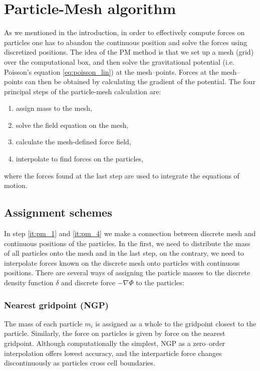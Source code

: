 \section{Particle-Mesh algorithm}
\label{sec:PM}
As we mentioned in the introduction, in order to effectively compute forces on particles one has to abandon the continuous position and solve the forces using discretized positions. The idea of the PM method is that we set up a mesh (grid) over the computational box, and then solve the gravitational potential (i.e. Poisson’s equation \eqref{eq:poisson_lin}) at the mesh--points. Forces at the mesh--points can then be obtained by calculating the gradient of the potential. The four principal steps of the particle-mesh calculation are:
\begin{enumerate}
    \item assign mass to the mesh,
    \label{it:pm_1}
    \item solve the field equation on the mesh,
    \label{it:pm_2}
    \item calculate the mesh-defined force field,
    \label{it:pm_3}
    \item interpolate to find forces on the particles,
    \label{it:pm_4}
\end{enumerate}
where the forces found at the last step are used to integrate the equations of motion.
\subsection{Assignment schemes}
In step \ref{it:pm_1} and \ref{it:pm_4} we make a connection between discrete mesh and continuous positions of the particles. In the first, we need to distribute the mass of all particles onto the mesh and in the last step, on the contrary, we need to interpolate forces known on the discrete mesh onto particles with continuous positions. There are several ways of assigning the particle masses to the discrete density function $\delta$ and discrete force $-\nabla\Phi$ to the particles:

\subsubsection{Nearest gridpoint (NGP)}
The mass of each particle $m_i$ is assigned as a whole to the gridpoint closest to the particle. Similarly, the force on particles is given by force on the nearest gridpoint. Although computationally the simplest, NGP as a zero--order interpolation offers lowest accuracy, and the interparticle force changes discontinuously as particles cross cell boundaries.

